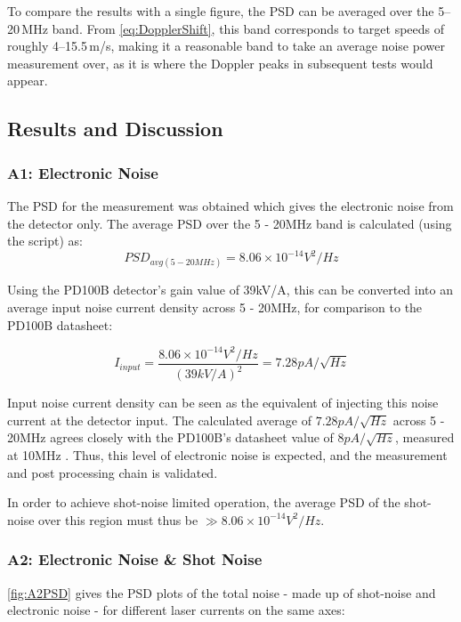  To compare the results with a single figure, the PSD can be averaged over the 5--20\,MHz band.
 From \autoref{eq:DopplerShift}, this band corresponds to target speeds of roughly
 4--15.5\,m/s, making it a reasonable band to take an average noise power measurement over, as it is where the Doppler peaks in subsequent tests would appear.

\subsection{Results and Discussion}
\subsubsection{A1: Electronic Noise}
The PSD for the measurement was obtained which gives the electronic noise from the detector only. The average PSD over the 5 - 20MHz band is calculated (using the script) as:
\begin{equation}
	PSD_{avg (5 - 20MHz)} = 8.06\times 10^{-14}V^2/Hz
\end{equation}

Using the PD100B detector's gain value of 39kV/A, this can be converted into an average input noise current density across 5 - 20MHz, for comparison to the PD100B datasheet:

\begin{equation}
    I_{input} = \frac{8.06\times 10^{-14}V^2/Hz}{(39kV/A)^2}=7.28pA/\sqrt{Hz}
\end{equation}

Input noise current density can be seen as the equivalent of injecting this noise current at the detector input. The calculated average of $7.28pA/\sqrt{Hz}$ across 5 - 20MHz agrees closely with the PD100B's datasheet value of $8pA/\sqrt{Hz}$, measured at 10MHz \cite{Koheron PD100B}. Thus, this level of electronic noise is expected, and the measurement and post processing chain is validated. 

In order to achieve shot-noise limited operation, the average PSD of the shot-noise over this region must thus be $\gg8.06\times 10^{-14}V^2/Hz$.

\subsubsection{A2: Electronic Noise \& Shot Noise}
\autoref{fig:A2PSD} gives the PSD plots of the total noise - made up of shot-noise and electronic noise - for different laser currents on the same axes:

